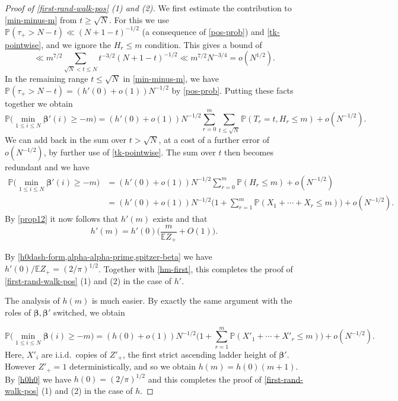 \documentclass[11pt,reqno]{amsart}
\numberwithin{equation}{section}
\theoremstyle{definition}
\theoremstyle{remark}
\newcommand{\mb}{\mathbb}
\def\boldbeta{\boldsymbol\beta}
\renewcommand{\le}{\leqslant}
\renewcommand{\ge}{\geqslant}
\begin{document}
\begin{proof}[Proof of \cref{first-rand-walk-pos} (1) and (2)]
We first estimate the contribution to \cref{min-minus-m} from $t \ge \sqrt{N}$. For this we use $\mb{P}(\tau_+ > N - t) \ll (N+ 1- t)^{-1/2}$ (a consequence of \cref{pos-prob}) and \cref{tk-pointwise}, and we ignore the $H_r \le m$ condition. This gives a bound of
\[ \ll m^{7/2} \sum_{\sqrt{N} < t \le N} t^{-3/2} (N +1 - t)^{-1/2} \ll m^{7/2} N^{-3/4} = o(N^{1/2}).\] 
In the remaining range $t \le \sqrt{N}$ in \cref{min-minus-m}, we have $\mb{P}(\tau_+ > N-t) = (h'(0) + o(1)) N^{-1/2}$ by \cref{pos-prob}. Putting these facts together we obtain 
\[ \mb{P}\big(\min_{1 \le i \le N} \boldbeta'(i) \ge -m\big) = (h'(0) + o(1)) N^{-1/2} \sum_{r = 0}^m \sum_{t \le \sqrt{N}} \mb{P}(T_r = t, H_r \le m) + o(N^{-1/2}).\]
We can add back in the sum over $t > \sqrt{N}$, at a cost of a further error of $o(N^{-1/2})$, by further use of \cref{tk-pointwise}. The sum over $t$ then becomes redundant and we have
\begin{align*} \mb{P}\big(\min_{1 \le i \le N} \boldbeta'(i) \ge -m\big) & = (h'(0) + o(1)) N^{-1/2} \sum_{r = 0}^m \mb{P}(H_r \le m) + o(N^{-1/2}) \\ & = (h'(0) + o(1)) N^{-1/2}\big( 1 +  \sum_{r = 1}^m \mb{P}(X_1 + \cdots + X_r \le m)\big) + o(N^{-1/2}) .\end{align*}
By \cref{prop12} it now follows that $h'(m)$ exists and that 
\begin{equation}\label{hm-first} h'(m) =  h'(0)\big(\frac{m}{\mb{E} Z_+} + O(1)\big).\end{equation}

By \cref{h0dash-form,alpha-alpha-prime,spitzer-beta} we have $h'(0)/\mb{E} Z_+ = (2/\pi)^{1/2}$. Together with \cref{hm-first}, this completes the proof of \cref{first-rand-walk-pos} (1) and (2) in the case of $h'$.

The analysis of $h(m)$ is much easier. By exactly the same argument with the roles of $\boldbeta,\boldbeta'$ switched, we obtain

\[ \mb{P}\big(\min_{1 \le i \le N} \boldbeta(i) \ge -m\big)  = (h(0) + o(1)) N^{-1/2} \big( 1 + \sum_{r = 1}^m \mb{P}(X'_1 + \cdots + X'_r \le m)\big) + o(N^{-1/2}) .\]
Here, $X'_i$ are i.i.d.\ copies of $Z'_+$, the first strict ascending ladder height of $\boldbeta'$. However $Z'_+ = 1$ deterministically, and so we obtain $h(m) = h(0) (m + 1)$. By \cref{h0h0} we have $h(0) = (2/\pi)^{1/2}$ and this completes the proof of \cref{first-rand-walk-pos} (1) and (2) in the case of $h$.\end{proof}
\end{document}
